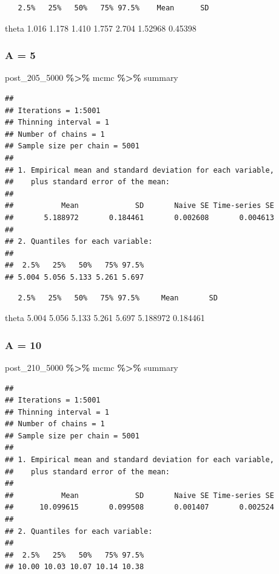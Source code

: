 \documentclass[
]{article}
\newenvironment{Shaded}{\begin{snugshade}}{\end{snugshade}}
\newcommand{\NormalTok}[1]{#1}
\newcommand{\SpecialCharTok}[1]{\textcolor[rgb]{0.81,0.36,0.00}{\textbf{#1}}}
\begin{document}
\begin{verbatim}
   2.5%   25%   50%   75% 97.5%    Mean      SD
\end{verbatim}

theta 1.016 1.178 1.410 1.757 2.704 1.52968 0.45398

\subsubsection{A = 5}\label{a-5-1}

\begin{Shaded}
\begin{Highlighting}[]
\NormalTok{post\_205\_5000 }\SpecialCharTok{\%\textgreater{}\%}\NormalTok{ mcmc }\SpecialCharTok{\%\textgreater{}\%}\NormalTok{ summary}
\end{Highlighting}
\end{Shaded}

\begin{verbatim}
## 
## Iterations = 1:5001
## Thinning interval = 1 
## Number of chains = 1 
## Sample size per chain = 5001 
## 
## 1. Empirical mean and standard deviation for each variable,
##    plus standard error of the mean:
## 
##           Mean             SD       Naive SE Time-series SE 
##       5.188972       0.184461       0.002608       0.004613 
## 
## 2. Quantiles for each variable:
## 
##  2.5%   25%   50%   75% 97.5% 
## 5.004 5.056 5.133 5.261 5.697
\end{verbatim}

\begin{verbatim}
   2.5%   25%   50%   75% 97.5%     Mean       SD
\end{verbatim}

theta 5.004 5.056 5.133 5.261 5.697 5.188972 0.184461

\subsubsection{A = 10}\label{a-10-1}

\begin{Shaded}
\begin{Highlighting}[]
\NormalTok{post\_210\_5000 }\SpecialCharTok{\%\textgreater{}\%}\NormalTok{ mcmc }\SpecialCharTok{\%\textgreater{}\%}\NormalTok{ summary}
\end{Highlighting}
\end{Shaded}

\begin{verbatim}
## 
## Iterations = 1:5001
## Thinning interval = 1 
## Number of chains = 1 
## Sample size per chain = 5001 
## 
## 1. Empirical mean and standard deviation for each variable,
##    plus standard error of the mean:
## 
##           Mean             SD       Naive SE Time-series SE 
##      10.099615       0.099508       0.001407       0.002524 
## 
## 2. Quantiles for each variable:
## 
##  2.5%   25%   50%   75% 97.5% 
## 10.00 10.03 10.07 10.14 10.38
\end{verbatim}
\end{document}
